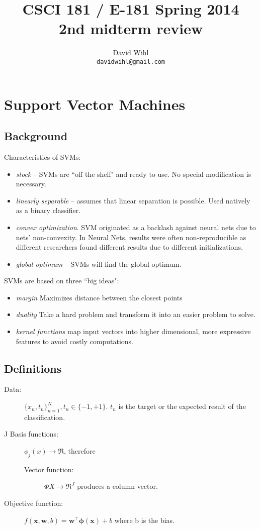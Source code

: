 \documentclass[11pt, oneside]{article}   	%
\title{CSCI 181 / E-181 Spring 2014 \\ 
{\large 2nd midterm review}
}
\author{
  David Wihl\\
  \texttt{davidwihl@gmail.com}
}
\begin{document}
\maketitle

\section{Support Vector Machines}

\subsection{Background}
Characteristics of SVMs:
\begin{itemize}
	\item \emph{stock} -- SVMs are ``off the shelf" and ready to use. No special modification is necessary.
	\item \emph{linearly separable} -- assumes that linear separation is possible. Used natively as a binary classifier.
	\item \emph{convex optimization}. SVM originated as a backlash against neural nets due to nets' non-convexity. In Neural Nets, results were often non-reproducible as different researchers found different results due to different initializations.
	\item \emph{global optimum} -- SVMs will find the global optimum.
\end{itemize}

SVMs are based on three ``big ideas":
\begin{itemize}
	\item \emph{margin} Maximizes distance between the closest points
	\item \emph{duality} Take a hard problem and transform it into an easier problem to solve.
	\item \emph{kernel functions} map input vectors into higher dimensional, more expressive features to avoid costly computations.
\end{itemize}

\subsection{Definitions}

\begin{description}
	\item[Data:] $\{x_n,t_n\}_{n=1}^N, t_n \in \{-1, +1\}$. $t_n$ is the target or the expected result of the classification.
	\item[J Basis functions:] $\phi_j(x)\rightarrow\Re$, therefore
	\begin{description}
		\item[Vector function:] $\Phi X \rightarrow \Re^J$ produces a column vector.
	\end{description}
	\item[Objective function:]
$f(\textbf{x},\textbf{w},b) = \textbf{w}^\intercal \mathbf{\phi}(\textbf{x})  + b$
where b is the bias.
\end{description}
\end{document}
